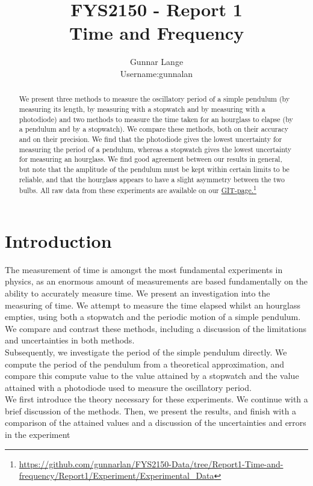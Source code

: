 \documentclass[a4paper, 10pt]{article}
\title{FYS2150 - Report 1\\
Time and Frequency}
\author{Gunnar Lange\\ Username:gunnalan}
\date{}
\begin{document}
\maketitle
\begin{abstract}
\begin{center}
We present three methods to measure the oscillatory period of a simple pendulum (by measuring its length, by measuring with a stopwatch and by measuring with a photodiode) and two methods to measure the time taken for an hourglass to  elapse (by a pendulum and by a stopwatch). We compare these methods, both on their accuracy and on their precision. We find that the photodiode gives the lowest uncertainty for measuring the period of a pendulum, whereas a stopwatch gives the lowest uncertainty for measuring an hourglass. We find good agreement between our results in general, but note that the amplitude of the pendulum must be kept within certain limits to be reliable, and that the hourglass appears to have a slight asymmetry between the two bulbs. All raw data from these experiments are available on our \href{https://github.com/gunnarlan/FYS2150-Data/tree/Report1-Time-and-frequency/Report1/Experiment/Experimental_Data}{GIT-page.}\footnote{\url{https://github.com/gunnarlan/FYS2150-Data/tree/Report1-Time-and-frequency/Report1/Experiment/Experimental_Data}}
\end{center}
\end{abstract}
\section{Introduction}
The measurement of time is amongst the most fundamental experiments in physics, as an enormous amount of measurements are based fundamentally on the ability to accurately measure time. We present an investigation into the measuring of time. We attempt to measure the time elapsed whilst an hourglass empties, using both a stopwatch and the periodic motion of a simple pendulum. We compare and contrast these methods, including a discussion of the limitations and uncertainties in both methods.\\
\linebreak
Subsequently, we investigate the period of the simple pendulum directly. We compute the period of the pendulum from a theoretical approximation, and compare this compute value to the value attained by a stopwatch and the value attained with a photodiode used to measure the oscillatory period.\\
\linebreak
We first introduce the theory necessary for these experiments. We continue with a brief discussion of the methods. Then, we present the results, and finish with a comparison of the attained values and a discussion of the uncertainties and errors in the experiment
\end{document}
